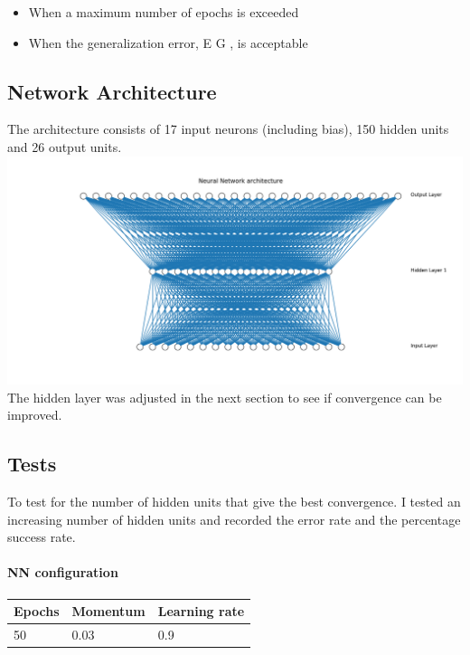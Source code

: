 \documentclass[11pt]{article}
\makeatletter
\def\maxwidth{\ifdim\Gin@nat@width>\linewidth\linewidth
    \else\Gin@nat@width\fi}
\let\Oldincludegraphics\includegraphics
\renewcommand{\includegraphics}[1]{\Oldincludegraphics[width=.8\maxwidth]{#1}}
\providecommand{\tightlist}{%
      \setlength{\itemsep}{0pt}\setlength{\parskip}{0pt}}
\makeatother
\begin{document}
\begin{itemize}
\tightlist
\item
  When a maximum number of epochs is exceeded
\item
  When the generalization error, E G , is acceptable
\end{itemize}

\hypertarget{network-architecture}{%
\subsection{Network Architecture}\label{network-architecture}}

The architecture consists of 17 input neurons (including bias), 150
hidden units and 26 output units. \includegraphics{Experiment3NN.png}
The hidden layer was adjusted in the next section to see if convergence
can be improved.

\hypertarget{tests}{%
\subsection{Tests}\label{tests}}

To test for the number of hidden units that give the best convergence. I
tested an increasing number of hidden units and recorded the error rate
and the percentage success rate.

\hypertarget{nn-configuration}{%
\paragraph{NN configuration}\label{nn-configuration}}

\begin{longtable}[]{@{}lll@{}}
\toprule
Epochs & Momentum & Learning rate\tabularnewline
\midrule
\endhead
50 & 0.03 & 0.9\tabularnewline
\bottomrule
\end{longtable}
\end{document}

